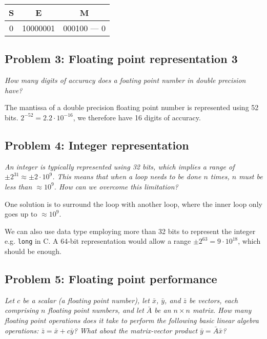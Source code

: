 \bigskip
\begin{center}
  \begin{tabular}{|c|c|c|}
    \hline
    S & E & M \\
    \hline
    0 & 10000001 & 000100 --- 0 \\
    \hline
  \end{tabular}
\end{center}


\subsection{Problem 3: Floating point representation 3} %
\label{sec:exercise_3}
\begin{question}
  \emph{How many digits of accuracy does a foating point number in double precision have?
}
\end{question}
The mantissa of a double precision floating point number is represented using 52 bits. $2^{-52} = 2.2\cdot 10^{-16}$, we therefore have 16 digits of accuracy.


\subsection{Problem 4: Integer representation} %
\label{sec:exercise_4}
\begin{question}
  \emph{An integer is typically represented using 32 bits, which implies a range of $\pm 2^{31} \approx \pm 2\cdot 10^9$. This means that when a loop needs to be done $n$ times, $n$ must be less than  $\approx 10^9$. How can we overcome this limitation?}
\end{question}

One solution is to surround the loop with another loop, where the inner loop only goes up to $\approx 10^9$.

We can also use data type employing more than 32 bits to represent the integer e.g. \texttt{long} in C. A 64-bit representation would allow a range $\pm 2^{63} = 9\cdot 10^18$, which should be enough.


\subsection{Problem 5: Floating point performance} %
\label{sec:exercise_5}
\begin{question}
  \emph{ Let $c$ be a scalar (a floating point number), let $\bar{x}$, $\bar{y}$, and $\bar{z}$ be vectors, each comprising $n$  floating point numbers, and let $\bar{A}$ be an $n\times n$ matrix. How many floating point operations does it take to perform the following basic linear algebra operations: $\bar{z} = \bar{x} + c \bar{y}$? What about the matrix-vector product $\bar{y} = \bar{A}\bar{x}$?}
\end{question}

